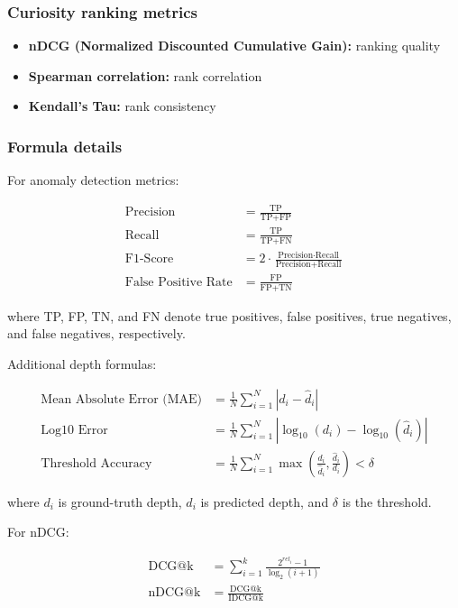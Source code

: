\documentclass[12pt]{article}
\begin{document}
\subsubsection{Curiosity ranking metrics}
\begin{itemize}
\item \textbf{nDCG (Normalized Discounted Cumulative Gain):} ranking quality
\item \textbf{Spearman correlation:} rank correlation
\item \textbf{Kendall's Tau:} rank consistency
\end{itemize}

\subsubsection{Formula details}
For anomaly detection metrics:

\begin{align}
\text{Precision} &= \frac{\text{TP}}{\text{TP} + \text{FP}} \\
\text{Recall} &= \frac{\text{TP}}{\text{TP} + \text{FN}} \\
\text{F1-Score} &= 2 \cdot \frac{\text{Precision} \cdot \text{Recall}}{\text{Precision} + \text{Recall}} \\
\text{False Positive Rate} &= \frac{\text{FP}}{\text{FP} + \text{TN}}
\end{align}

where TP, FP, TN, and FN denote true positives, false positives, true negatives, and false negatives, respectively.

Additional depth formulas:

\begin{align}
\text{Mean Absolute Error (MAE)} &= \frac{1}{N} \sum_{i=1}^{N} |d_i - \hat{d}_i| \\
\text{Log10 Error} &= \frac{1}{N} \sum_{i=1}^{N} |\log_{10}(d_i) - \log_{10}(\hat{d}_i)| \\
\text{Threshold Accuracy} &= \frac{1}{N} \sum_{i=1}^{N} \max\left(\frac{d_i}{\hat{d}_i}, \frac{\hat{d}_i}{d_i}\right) < \delta
\end{align}

where \(d_i\) is ground-truth depth, \(\hat{d}_i\) is predicted depth, and \(\delta\) is the threshold.

For nDCG:

\begin{align}
\text{DCG@k} &= \sum_{i=1}^{k} \frac{2^{rel_i} - 1}{\log_2(i + 1)} \\
\text{nDCG@k} &= \frac{\text{DCG@k}}{\text{IDCG@k}}
\end{align}
\end{document}
